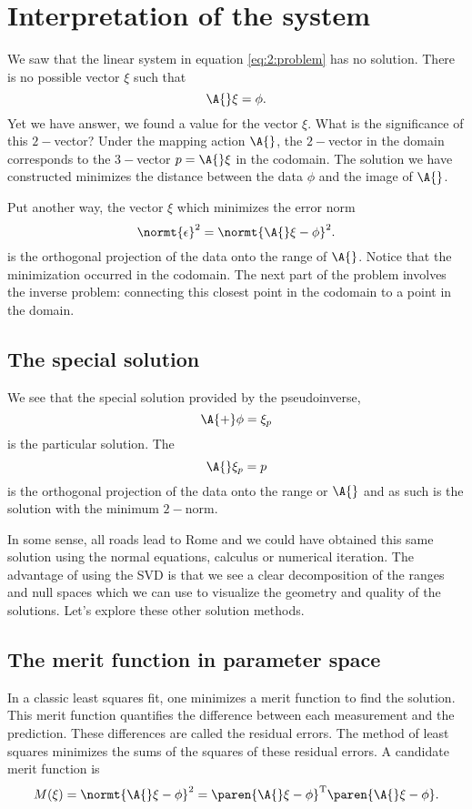 \section{Interpretation of the system}
We saw that the linear system in equation \eqref{eq:2:problem} has no solution. There is no possible vector $\xi$ such that
\begin{equation}
  \A{}\xi=\phi.
\end{equation}
Yet we have answer, we found a value for the vector $\xi$. What is the significance of this $2-$vector? Under the mapping action $\A{}$, the $2-$vector in the domain corresponds to the $3-$vector $p=\A{}\xi$ in the codomain. The solution we have constructed minimizes the distance between the data $\phi$ and the image of $\A{}$. 

Put another way, the vector $\xi$ which minimizes the error norm
\begin{equation}
  \normt{\epsilon}^{2} = \normt{\A{}\xi-\phi}^{2}.
\end{equation}
is the orthogonal projection of the data onto the range of $\A{}$. Notice that the minimization occurred in the codomain. The next part of the problem involves the inverse problem: connecting this closest point in the codomain to a point in the domain.

\subsection{The special solution}
We see that the special solution provided by the pseudoinverse,
\begin{equation}
  \A{+}\phi = \xi_{p}
\end{equation}
is the particular solution. The \vvv 
\begin{equation*}
  \A{}\xi_{p} = p
\end{equation*}
is the orthogonal projection of the data onto the range or $\A{}$ and as such is the solution with the minimum $2-$norm.

In some sense, all roads lead to Rome and we could have obtained this same solution using the normal equations, calculus or numerical iteration. The advantage of using the SVD is that we see a clear decomposition of the ranges and null spaces which we can use to visualize the geometry and quality of the solutions. Let's explore these other solution methods.

\subsection{The merit function in parameter space}
In a classic least squares fit, one minimizes a merit function to find the solution. This merit function quantifies the difference between each measurement and the prediction. These differences are called the residual errors. The method of least squares minimizes the sums of the squares of these residual errors. A candidate merit function is
\begin{equation}
  M(\xi) = \normt{\A{}\xi-\phi}^{2} = \paren{\A{}\xi-\phi}^{\mathrm{T}}\paren{\A{}\xi-\phi}.
  \label{eq:merit}
\end{equation}

